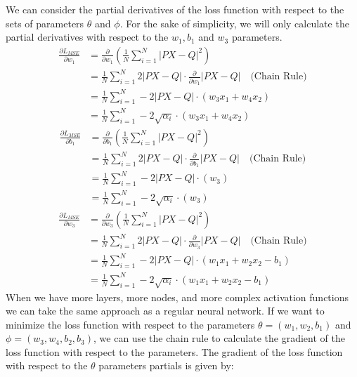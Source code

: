 \documentclass[answers,12pt,addpoints]{exam}
\begin{document}
We can consider the partial derivatives of the loss function with respect to the sets of parameters $\theta$ and $\phi$. For the sake of simplicity, we will only calculate the partial derivatives with respect to the $w_1, b_1$ and $w_3$ parameters.
\begin{align*}
    \frac{\partial L_{MSE}}{\partial w_1} &= \frac{\partial }{\partial w_1} \left( \frac{1}{N} \sum_{i=1}^{N} \left| P X - Q \right|^2 \right) \\
    &= \frac{1}{N} \sum_{i=1}^{N} 2 \left| P X - Q \right| \cdot \frac{\partial }{\partial w_1} \left| P X - Q \right| \quad \text{(Chain Rule)} \\
    &= \frac{1}{N} \sum_{i=1}^{N} - 2 \left| P X - Q \right| \cdot (w_3 x_1 + w_4 x_2) \\ 
    &= \frac{1}{N} \sum_{i=1}^{N} - 2 \sqrt{\alpha_i} \cdot (w_3 x_1 + w_4 x_2)
\end{align*}
\begin{align*}
    \frac{\partial L_{MSE}}{\partial b_1} &= \frac{\partial }{\partial b_1} \left( \frac{1}{N} \sum_{i=1}^{N} \left| P X - Q \right|^2 \right) \\
    &= \frac{1}{N} \sum_{i=1}^{N} 2 \left| P X - Q \right| \cdot \frac{\partial }{\partial b_1} \left| P X - Q \right| \quad \text{(Chain Rule)} \\
    &= \frac{1}{N} \sum_{i=1}^{N} - 2 \left| P X - Q \right| \cdot (w_3) \\
    &= \frac{1}{N} \sum_{i=1}^{N} - 2 \sqrt{\alpha_i} \cdot (w_3) 
\end{align*}
\begin{align*}
    \frac{\partial L_{MSE}}{\partial w_3} &= \frac{\partial }{\partial w_3} \left( \frac{1}{N} \sum_{i=1}^{N} \left| P X - Q \right|^2 \right) \\
    &= \frac{1}{N} \sum_{i=1}^{N} 2 \left| P X - Q \right| \cdot \frac{\partial }{\partial w_3} \left| P X - Q \right| \quad \text{(Chain Rule)} \\
    &= \frac{1}{N} \sum_{i=1}^{N} - 2 \left| P X - Q \right| \cdot (w_1 x_1 + w_2 x_2 - b_1) \\
    &= \frac{1}{N} \sum_{i=1}^{N} - 2 \sqrt{\alpha_i} \cdot (w_1 x_1 + w_2 x_2 - b_1)
\end{align*}
When we have more layers, more nodes, and more complex activation functions we can take the same approach as a regular neural network. If we want to minimize the loss function with respect to the parameters $\theta = (w_1, w_2, b_1)$ and $\phi = (w_3, w_4, b_2, b_3)$, we can use the chain rule to calculate the gradient of the loss function with respect to the parameters. The gradient of the loss function with respect to the $\theta$ parameters partials is given by:
\end{document}
